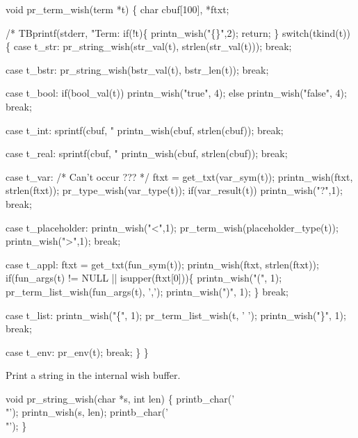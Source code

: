 void pr_term_wish(term *t)
\{
  char cbuf[100], *ftxt;

  /* TBprintf(stderr, "Term: %
  if(!t)\{
    printn_wish("\{\}",2);
    return;
  \}
  switch(tkind(t))
    \{
    case t_str:
      pr_string_wish(str_val(t), strlen(str_val(t)));
      break;

    case t_bstr:
      pr_string_wish(bstr_val(t), bstr_len(t));
      break;

    case t_bool:
      if(bool_val(t)) 
        printn_wish("true", 4);
      else
        printn_wish("false", 4);
      break;

    case t_int:
      sprintf(cbuf, "%
      printn_wish(cbuf, strlen(cbuf));
      break;

    case t_real:
      sprintf(cbuf, "%
      printn_wish(cbuf, strlen(cbuf));
      break;

    case t_var: /* Can't occur ??? */
      ftxt = get_txt(var_sym(t));
      printn_wish(ftxt, strlen(ftxt));
      pr_type_wish(var_type(t));
      if(var_result(t))
        printn_wish("?",1);
      break;

    case t_placeholder:
      printn_wish("<",1);
      pr_term_wish(placeholder_type(t));
      printn_wish(">",1);
      break;

    case t_appl:
      ftxt = get_txt(fun_sym(t));
      printn_wish(ftxt, strlen(ftxt));
      if(fun_args(t) != NULL || isupper(ftxt[0]))\{
        printn_wish("(", 1);
        pr_term_list_wish(fun_args(t), ',');
        printn_wish(")", 1);
      \}
      break;

    case t_list:
      printn_wish("\{", 1); 
      pr_term_list_wish(t, ' ');
      printn_wish("\}", 1);
      break;

    case t_env:
      pr_env(t);
      break;
    \}
\}
\nwendcode{}\nwdocspar


Print a string in the internal wish buffer.

\nwenddocs{}\endmoddef\let\nwnotused=\nwoutput{}\nwstartdeflinemarkup{}\nwenddeflinemarkup
void pr_string_wish(char *s, int len)
\{
  printb_char('\\"');
  printn_wish(s, len);
  printb_char('\\"');
\}
\nwendcode{}\nwdocspar

